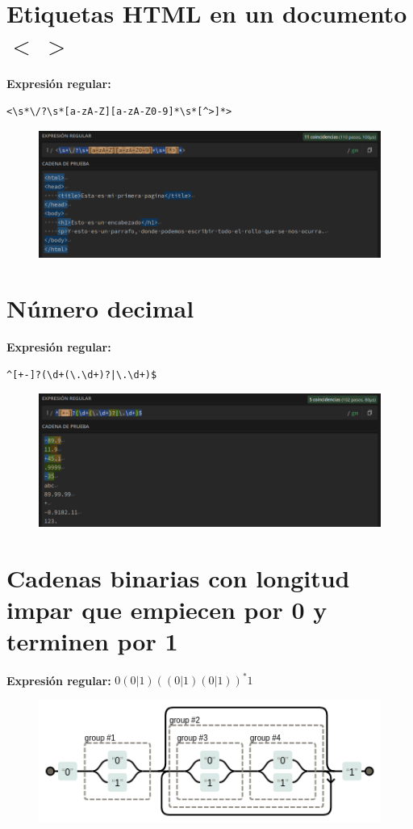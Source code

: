 \documentclass[11pt]{report}
\begin{document}
\section{Etiquetas HTML en un documento $< \ >$}
\textbf{Expresión regular:} 
\begin{verbatim}
<\s*\/?\s*[a-zA-Z][a-zA-Z0-9]*\s*[^>]*>
\end{verbatim}
  \begin{figure}[H]
    \centering
    \includegraphics[scale=0.5]{img/modificacion_01.png} 
  \end{figure}

\section{Número decimal}
\textbf{Expresión regular:} 
\begin{verbatim}
^[+-]?(\d+(\.\d+)?|\.\d+)$
\end{verbatim}
  \begin{figure}[H]
    \centering
    \includegraphics[scale=0.5]{img/modificacion_02.png} 
  \end{figure}

\newpage

\section{Cadenas binarias con longitud impar que empiecen por 0 y terminen por 1}
\textbf{Expresión regular:} $0(0|1)((0|1)(0|1))^*1$
  \begin{figure}[H]
    \centering
    \includegraphics[scale=0.75]{img/modificacion_03.png} 
  \end{figure}
\end{document}
